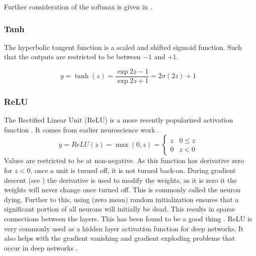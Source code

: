 \documentclass[12pt,parskip]{komatufte}
\begin{document}
Further consideration of the softmax is given in .

\subsubsection{Tanh}

The hyperbolic tangent function is a  scaled and shifted sigmoid function.
Such that the outputs are restricted to be between $-1$ and $+1$.

\begin{equation}
y=\tanh(z)=\frac{\exp{2z}-1}{\exp{2z}+1}=2\sigma(2z)+1
\end{equation}


\subsubsection{ReLU}

The Rectified Linear Unit (ReLU) is a more recently popularized activation function .
It comes from earlier neuroscience work .
\begin{equation}
y=ReLU(z)=\max \left( 0, z \right)=\begin{cases}
z & 0\le z\\
0 & z<0
\end{cases}
\end{equation}
Values are restricted to be at non-negative.
As this function has derivative zero for $z<0$, once a unit is turned off, it is not turned back-on.
During gradient descent (see ) the derivative is used to modify the weights, as it is zero it the weights will never change once turned off.
This is commonly called the neuron dying.
Further to this, using (zero mean) random initialization ensures that a significant portion of all neurons will initially be dead.
This results in sparse connections between the layers.
This has been found to be a good thing .
ReLU is very commonly used as a hidden layer activation function for deep networks.
It also helps with the gradient vanishing and gradient exploding problems that occur in deep networks \parencite{glorot2011deepRELUsparse}.
\end{document}
